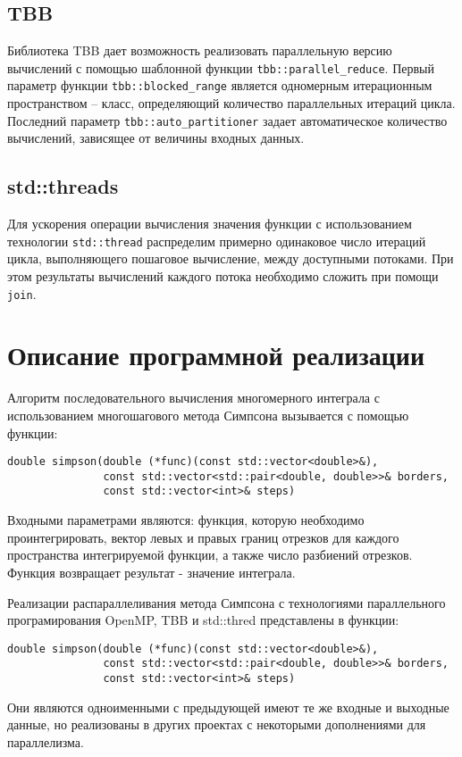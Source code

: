 \documentclass{report}
\begin{document}
\subsection*{TBB}
\par Библиотека TBB дает возможность реализовать параллельную версию вычислений с помощью шаблонной функции \verb|tbb::parallel_reduce|.
Первый параметр функции \verb|tbb::blocked_range| является одномерным итерационным пространством – класс, определяющий количество параллельных итераций цикла. Последний параметр \verb|tbb::auto_partitioner| задает автоматическое количество вычислений, зависящее от величины входных данных.
\subsection*{std::threads}
Для ускорения операции вычисления значения функции с использованием технологии \verb|std::thread| распределим примерно одинаковое число итераций цикла, выполняющего пошаговое вычисление, между доступными потоками. При этом результаты вычислений 
каждого потока необходимо сложить при помощи \verb|join|.
\newpage

\section*{Описание программной реализации}
Алгоритм последовательного вычисления многомерного интеграла с использованием многошагового метода Симпсона вызывается с помощью функции:
\begin{lstlisting}
double simpson(double (*func)(const std::vector<double>&),
               const std::vector<std::pair<double, double>>& borders,
               const std::vector<int>& steps)
\end{lstlisting}
\par Входными параметрами являются: функция, которую необходимо проинтегрировать, вектор левых и правых границ отрезков для каждого пространства интегрируемой функции, а также число разбиений отрезков. Функция возвращает результат - значение интеграла.
\par Реализации распараллеливания метода Симпсона с технологиями параллельного програмирования OpenMP, TBB и std::thred представлены в функции:
\begin{lstlisting}
double simpson(double (*func)(const std::vector<double>&),
               const std::vector<std::pair<double, double>>& borders,
               const std::vector<int>& steps)
\end{lstlisting}
\par Они являются одноименными с предыдующей имеют те же входные и выходные данные, но реализованы в других проектах с некоторыми дополнениями для параллелизма.
\newpage
\end{document}
